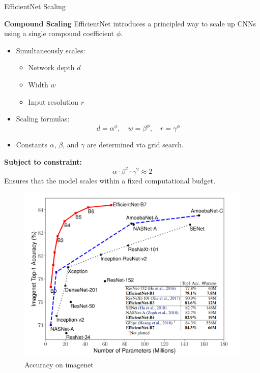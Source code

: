 \documentclass{beamer}
\begin{document}
\begin{frame}{EfficientNet Scaling}
    \begin{block}{\textbf{Compound Scaling}}
        EfficientNet introduces a principled way to scale up CNNs using a single compound coefficient $\phi$.
        \begin{itemize}
            \item Simultaneously scales:
            \begin{itemize}
                \item Network depth $d$
                \item Width $w$
                \item Input resolution $r$
            \end{itemize}
            \item Scaling formulas:
            \[
            d = \alpha^\phi, \quad w = \beta^\phi, \quad r = \gamma^\phi
            \]
            \item Constants $\alpha$, $\beta$, and $\gamma$ are determined via grid search.
        \end{itemize}
        \vspace{0.3em}
        \textbf{Subject to constraint:}
        \[
        \alpha \cdot \beta^2 \cdot \gamma^2 \approx 2
        \]
        Ensures that the model scales within a fixed computational budget.
    \end{block}
\end{frame}
\begin{frame}
    \begin{figure}
        \centering
        \includegraphics[width=0.8\linewidth]{effnet_imagenet.png}
        \caption{Accuracy on imagenet}
        \label{fig:efficientnet}
    \end{figure}
\end{frame}
\end{document}
